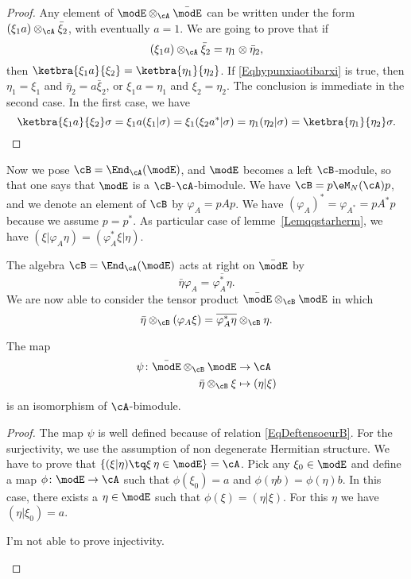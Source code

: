 \begin{proof}
	Any element of $\modE\otimes_{\cA}\bar\modE$ can be written under the form $(\xi_1 a)\otimes_{\cA}\bar\xi_2$, with eventually $a=1$. We are going to prove that if
	\begin{equation}		\label{Eqhypunxiaotibarxi}
		(\xi_1 a)\otimes_{\cA}\bar\xi_2=\eta_1\otimes\bar\eta_2,
	\end{equation}
	then $\ketbra{\xi_1 a}{\xi_2} =\ketbra{\eta_1}{\eta_2} $. If \eqref{Eqhypunxiaotibarxi} is true, then $\eta_1=\xi_1$ and $\bar\eta_2=a\bar\xi_2$, or $\xi_1a=\eta_1$ and $\xi_2=\eta_2$. The conclusion is immediate in the second case. In the first case, we have
	\[
		\ketbra{\xi_1 a}{\xi_2} \sigma=\xi_1 a( \xi_1 | \sigma) =\xi_1( \xi_2 a^* | \sigma) =\eta_1( \eta_2 | \sigma) =\ketbra{\eta_1}{\eta_2} \sigma.
	\]
\end{proof}

Now we pose $\cB=\End_{\cA}(\modE)$, and $\modE$ becomes a left $\cB$-module, so that one says that $\modE$ is a $\cB$-$\cA$-bimodule. We have $\cB=p\eM_N(\cA)p$, and we denote an element of $\cB$ by $\varphi_A=pAp$. We have $(\varphi_A)^*=\varphi_{A^*}=pA^*p$ because we assume $p=p^*$. As particular case of lemme~\ref{Lemqqstarherm}, we have $( \xi | \varphi_A\eta) =( \varphi_A^*\xi | \eta) $.

The algebra $\cB=\End_{\cA}(\modE)$ acts at right on $\bar\modE$ by
\begin{equation}
	\bar\eta\varphi_A=\overline{ \varphi_A^*\eta }.
\end{equation}
We are now able to consider the tensor product $\bar\modE\otimes_{\cB}\modE$ in which
\begin{equation}		\label{EqDeftensoeurB}
	\bar\eta\otimes_{\cB}(\varphi_A\xi)=\overline{ \varphi_A^*\eta }\otimes_{\cB}\eta.
\end{equation}
\begin{proposition}
	The map
	\begin{equation}
		\begin{aligned}
			\psi\colon \bar\modE\otimes_{\cB}\modE & \to \cA               \\
			\bar\eta\otimes_{\cB}\xi               & \mapsto ( \eta | \xi)
		\end{aligned}
	\end{equation}
	is an isomorphism of $\cA$-bimodule.
\end{proposition}

\begin{proof}
	The map $\psi$ is well defined because of relation \eqref{EqDeftensoeurB}. For the surjectivity, we use the assumption of non degenerate Hermitian structure. We have to prove that $\{ ( \xi | \eta) \tq \xi\, \eta\in\modE  \}=\cA$. Pick any $\xi_0\in\modE$ and define a map $\phi\colon \modE\to \cA$ such that $\phi(\xi_0)=a$ and $\phi(\eta b)=\phi(\eta)b$. In this case, there exists a $\eta\in\modE$ such that $\phi(\xi)=( \eta | \xi) $. For this $\eta$ we have $( \eta | \xi_0)=a$.

	\begin{probleme}
		I'm not able to prove injectivity.
	\end{probleme}

\end{proof}

